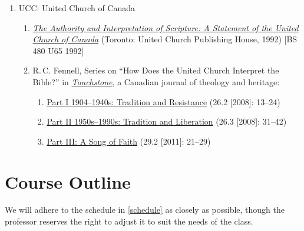 \documentclass[titlepage]{article}
\begin{document}
\begin{enumerate}
\item UCC: United Church of Canada

	\begin{enumerate}
	\item \href{https://ecumenism.net/archive/docu/1992_ucc_authority_interpretation_scripture.pdf}{\emph{The Authority and Interpretation of Scripture: A Statement of the United Church of Canada}} (Toronto: United Church Publishing House, 1992) [BS 480 U65 1992]
	\item R.\,C. Fennell, Series on “How Does the United Church Interpret the Bible?” in \href{http://touchstonecanada.ca}{\emph{Touchstone}}, a Canadian journal of theology and heritage:
		\begin{enumerate}
			\item\href{http://touchstonecanada.ca/wp-content/uploads/2013/08/Article2_2008-051.pdf}{Part I 1904–1940s: Tradition and Resistance} (26.2 [2008]: 13--24)
			\item\href{http://touchstonecanada.ca/wp-content/uploads/2013/08/3rdArticle_2008-09.pdf}{Part II 1950s–1990s: Tradition and Liberation} (26.3 [2008]: 31--42)
			\item\href{http://touchstonecanada.ca/wp-content/uploads/2013/08/Touchstone_May_2011.pdf}{Part III: A Song of Faith} (29.2 [2011]: 21--29)
		\end{enumerate}
	\end{enumerate}

\end{enumerate}


\section{Course Outline}
\label{outline}

We will adhere to the schedule in \autoref{schedule} as closely as
possible, though the professor reserves the right to adjust it to suit
the needs of the class.
\end{document}
